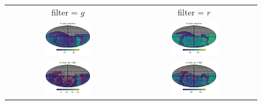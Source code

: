 \documentclass[preprintm,linenumbers]{aastex631}
\begin{document}
\begin{figure}
   		\centering
			\begin{tabular}{c c}
          filter = $g$ &  filter = $r$\\
   		\includegraphics[width=0.4\textwidth]{results/skymaps_cutout/skymaps_cutout_first_year_one_snap_v4_0_10yrs_db_noDD_noTwi_nside-256_CountMetric_g_noDD_noTwi.pdf} &
   		\includegraphics[width=0.4\textwidth]{results/skymaps_cutout/skymaps_cutout_first_year_one_snap_v4_0_10yrs_db_noDD_noTwi_nside-256_CountMetric_r_noDD_noTwi.pdf} \\

         \includegraphics[width=0.4\textwidth]{results/skymaps_cutout/skymaps_cutout_first_year_one_snap_v4_0_10yrs_db_noDD_noTwi_tscale-28_nside-256_doAllTemplateMetrics_reduceCount_g_noDD_noTwi.pdf} &
         \includegraphics[width=0.4\textwidth]{results/skymaps_cutout/skymaps_cutout_first_year_one_snap_v4_0_10yrs_db_noDD_noTwi_tscale-28_nside-256_doAllTemplateMetrics_reduceCount_r_noDD_noTwi.pdf} \\


\end{tabular}
\end{figure}
\end{document}

